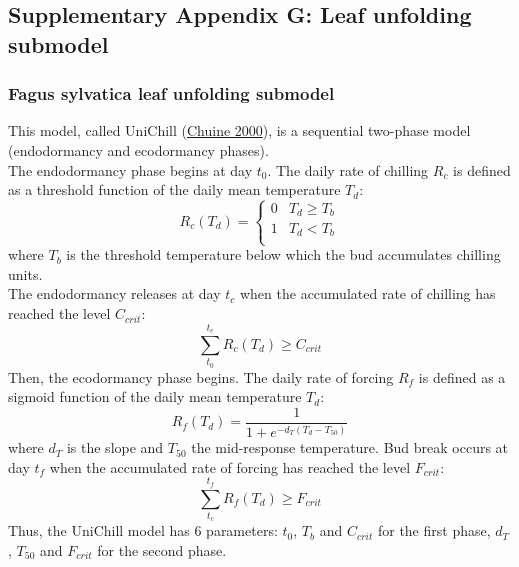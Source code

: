 \subsection{Supplementary Appendix G: Leaf unfolding
submodel}\label{chap1:appendixG}





\subsubsection{Fagus sylvatica leaf unfolding
submodel}\label{fagus-sylvatica-leaf-unfolding-submodel}

This model, called UniChill (\protect\hyperlink{ref-Chuine2000}{Chuine
2000}), is a sequential two-phase model (endodormancy and ecodormancy
phases).\\
The endodormancy phase begins at day \(t_0\). The daily rate of chilling
\(R_c\) is defined as a threshold function of the daily mean temperature
\(T_d\): \[ R_c(T_d) = \left\{
\begin{array}{ll}
      0 & T_d \geq T_b \\
      1 & T_d < T_b \\
\end{array} 
\right. \] where \(T_b\) is the threshold temperature below which the
bud accumulates chilling units.\\
The endodormancy releases at day \(t_c\) when the accumulated rate of
chilling has reached the level \(C_{crit}\):
\[\sum\limits_{t_0}^{t_c} R_c(T_d) \geq C_{crit} \] Then, the
ecodormancy phase begins. The daily rate of forcing \(R_f\) is defined
as a sigmoid function of the daily mean temperature \(T_d\):
\[R_f(T_d) = \frac{1}{1 + e^{-d_T(T_d-T_{50})}} \] where \(d_T\) is the
slope and \(T_{50}\) the mid-response temperature. Bud break occurs at
day \(t_f\) when the accumulated rate of forcing has reached the level
\(F_{crit}\): \[\sum\limits_{t_c}^{t_f} R_f(T_d) \geq F_{crit} \] Thus,
the UniChill model has 6 parameters: \(t_0\), \(T_b\) and \(C_{crit}\)
for the first phase, \(d_T\), \(T_{50}\) and \(F_{crit}\) for the second
phase.

